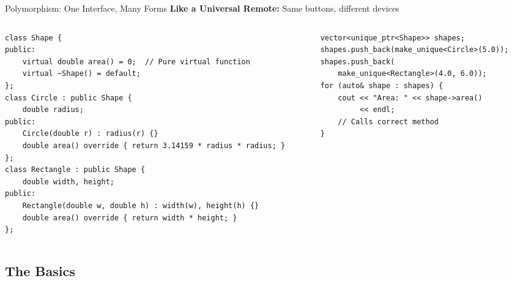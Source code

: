 \begin{frame}[fragile]{Polymorphism: One Interface, Many Forms}
	\textbf{Like a Universal Remote:} Same buttons, different devices

	\begin{columns}
		\begin{column}{0.6\textwidth}
			\begin{verbatim}
class Shape {
public:
    virtual double area() = 0;  // Pure virtual function
    virtual ~Shape() = default;
};
class Circle : public Shape {
    double radius;
public:
    Circle(double r) : radius(r) {}
    double area() override { return 3.14159 * radius * radius; }
};
class Rectangle : public Shape {
    double width, height;
public:
    Rectangle(double w, double h) : width(w), height(h) {}
    double area() override { return width * height; }
};
    \end{verbatim}
		\end{column}
		\begin{column}{0.4\textwidth}

			\begin{verbatim}
vector<unique_ptr<Shape>> shapes;
shapes.push_back(make_unique<Circle>(5.0));
shapes.push_back(
    make_unique<Rectangle>(4.0, 6.0));
for (auto& shape : shapes) {
    cout << "Area: " << shape->area()
         << endl;
    // Calls correct method
}
    \end{verbatim}
		\end{column}
	\end{columns}
\end{frame}

\subsection{The Basics}


